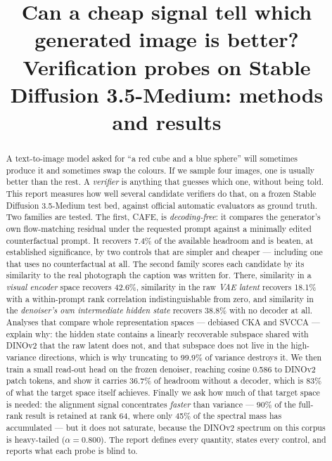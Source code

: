 \documentclass[10pt]{article}
\title{\textbf{Can a cheap signal tell which generated image is better?}\\
\large Verification probes on Stable Diffusion 3.5-Medium: methods and results}
\author{}
\date{}
\newcommand{\obs}[1]{\textcolor{observedblue}{#1}}
\newcommand{\method}{\textsf{CAFE}\xspace}
\begin{document}
\maketitle
\vspace{-0.4in}

\begin{abstract}
\noindent
A text-to-image model asked for ``a red cube and a blue sphere'' will sometimes produce it and
sometimes swap the colours. If we sample four images, one is usually better than the rest. A
\emph{verifier} is anything that guesses which one, without being told. This report measures how well
several candidate verifiers do that, on a frozen Stable Diffusion 3.5-Medium test bed, against
official automatic evaluators as ground truth. Two families are tested. The first,
\method, is \emph{decoding-free}: it compares the generator's own flow-matching residual under the
requested prompt against a minimally edited counterfactual prompt. It recovers \obs{7.4\%} of the
available headroom and is beaten, at established significance, by two controls that are simpler and
cheaper --- including one that uses no counterfactual at all. The second family scores each candidate
by its similarity to the real photograph the caption was written for. There, similarity in a
\emph{visual encoder} space recovers \obs{42.6\%}, similarity in the raw \emph{VAE latent} recovers
\obs{18.1\%} with a within-prompt rank correlation indistinguishable from zero, and similarity in the
\emph{denoiser's own intermediate hidden state} recovers \obs{38.8\%} with no decoder at all. Analyses
that compare whole representation spaces --- debiased CKA and SVCCA --- explain why: the hidden state
contains a linearly recoverable subspace shared with DINOv2 that the raw latent does not, and that
subspace does not live in the high-variance directions, which is why truncating to 99.9\% of variance
destroys it. We then train a small read-out head on the frozen denoiser, reaching cosine
\obs{0.586} to DINOv2 patch tokens, and show it carries \obs{36.7\%} of headroom without a decoder,
which is \obs{83\%} of what the target space itself achieves. Finally we ask how much of that target
space is needed: the alignment signal concentrates \emph{faster} than variance --- \obs{90\%} of the
full-rank result is retained at rank \obs{64}, where only \obs{45\%} of the spectral mass has
accumulated --- but it does not saturate, because the DINOv2 spectrum on this corpus is heavy-tailed
(\obs{$\alpha=0.800$}). The report defines every quantity, states every control, and reports what
each probe is blind to.
\end{abstract}
\end{document}
